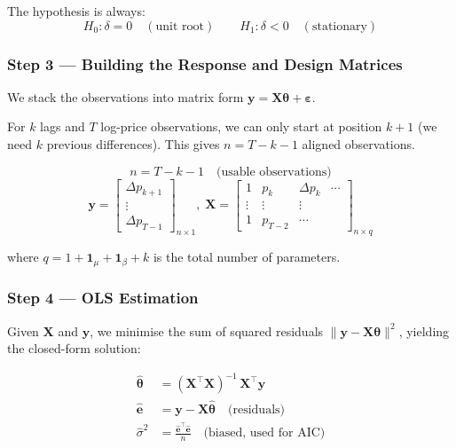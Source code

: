 \documentclass[10pt,a4paper,twocolumn]{article}
\begin{document}
\noindent The hypothesis is always:
\[
  H_0: \delta = 0 \quad(\text{unit root})\qquad
  H_1: \delta < 0 \quad(\text{stationary})
\]

\subsubsection{Step 3 --- Building the Response and Design Matrices}

We stack the observations into matrix form $\mathbf{y} = \mathbf{X}\boldsymbol\theta + \boldsymbol\varepsilon$.

For $k$ lags and $T$ log-price observations, we can only start at
position $k+1$ (we need $k$ previous differences).  This gives
$n = T - k - 1$ aligned observations.

\begin{tcolorbox}[mathbox={Formula 3 --- Matrix Alignment}]
\vspace{-4pt}
\begin{equation}
  n = T - k - 1 \quad\text{(usable observations)}
\end{equation}
{\small
\begin{equation}
  \mathbf{y} =
  \begin{bmatrix}\Delta p_{k+1}\\\vdots\\\Delta p_{T-1}
  \end{bmatrix}_{n\times1}\!,\;
  \mathbf{X} =
  \begin{bmatrix}
    1 & p_k & \Delta p_k & \cdots\\
    \vdots&\vdots&\vdots\\
    1 & p_{T-2} & \cdots
  \end{bmatrix}_{n\times q}
\end{equation}
}
\vspace{-4pt}
\end{tcolorbox}

\noindent where $q = 1 + \mathbf{1}_\mu + \mathbf{1}_\beta + k$ is
the total number of parameters.

\subsubsection{Step 4 --- OLS Estimation}

Given $\mathbf{X}$ and $\mathbf{y}$, we minimise the sum of squared
residuals $\|\mathbf{y} - \mathbf{X}\boldsymbol\theta\|^2$, yielding
the closed-form solution:

\begin{tcolorbox}[mathbox={Formula 4 --- OLS Normal Equations}]
\vspace{-4pt}
\begin{align}
  \hat{\boldsymbol\theta} &=
    (\mathbf{X}^\top\mathbf{X})^{-1}\,\mathbf{X}^\top\mathbf{y}
    \label{eq:ols}\\
  \hat{\mathbf{e}} &= \mathbf{y} - \mathbf{X}\hat{\boldsymbol\theta}
    \quad\text{(residuals)}\\
  \hat\sigma^2 &= \frac{\hat{\mathbf{e}}^\top\hat{\mathbf{e}}}{n}
    \quad\text{(biased, used for AIC)}
\end{align}
\vspace{-4pt}
\end{tcolorbox}
\end{document}
